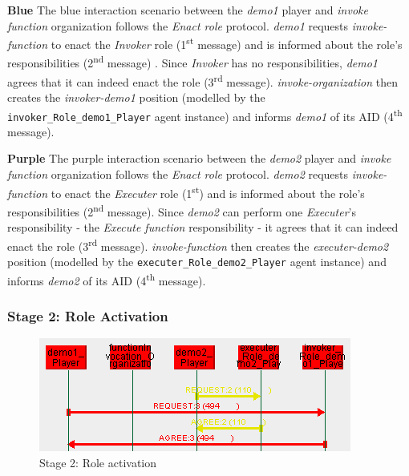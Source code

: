\textbf{Blue} The blue interaction scenario between the \textit{demo1} player and \textit{invoke function} organization follows the \textit{Enact role} protocol.
\textit{demo1} requests \textit{invoke-function} to enact the \textit{Invoker} role (1\textsuperscript{st} message) and is informed about the role's responsibilities (2\textsuperscript{nd} message) .
Since \textit{Invoker} has no responsibilities, \textit{demo1} agrees that it can indeed enact the role (3\textsuperscript{rd} message).
\textit{invoke-organization} then creates the \textit{invoker-demo1} position (modelled by the \texttt{invoker\_Role\_demo1\_Player} agent instance) and informs \textit{demo1} of its AID (4\textsuperscript{th} message).

\textbf{Purple} The purple interaction scenario between the \textit{demo2} player and \textit{invoke function} organization follows the \textit{Enact role} protocol.
\textit{demo2} requests \textit{invoke-function} to enact the \textit{Executer} role (1\textsuperscript{st}) and is informed about the role's responsibilities (2\textsuperscript{nd} message).
Since \textit{demo2} can perform one \textit{Executer}'s responsibility - the \textit{Execute function} responsibility - it agrees that it can indeed enact the role (3\textsuperscript{rd} message).
\textit{invoke-function} then creates the \textit{executer-demo2} position (modelled by the \texttt{executer\_Role\_demo2\_Player} agent instance) and informs \textit{demo2} of its AID (4\textsuperscript{th} message).

\subsubsection*{Stage 2: Role Activation}

\begin{figure}[H]
	\centering
	\includegraphics[width=\textwidth]{images/example1-stage2.png}
	\caption{Stage 2: Role activation}
	\label{figure:example1-stage2}
\end{figure}

